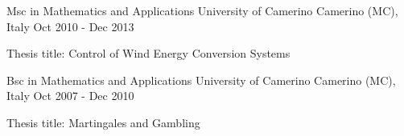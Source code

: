 

\begin{cventries}

  \cventry
    {Msc in Mathematics and Applications} %
    {University of Camerino} %
    {Camerino (MC), Italy} %
    {Oct 2010 - Dec 2013} %
    {
      \begin{cvitems} %
        \item {Thesis title: Control of Wind Energy Conversion Systems}
      \end{cvitems}
    }

  \cventry
    {Bsc in Mathematics and Applications} %
    {University of Camerino} %
    {Camerino (MC), Italy} %
    {Oct 2007 - Dec 2010} %
    {
      \begin{cvitems} %
        \item {Thesis title: Martingales and Gambling}
      \end{cvitems}
    }

\end{cventries}
